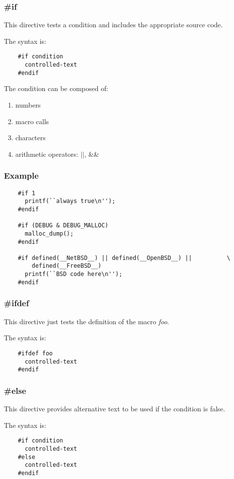 \documentclass[8pt]{beamer}
\newcommand{\nl}[0]{\vspace{0.4cm}}
\begin{document}
\begin{frame}[containsverbatim]
  \frametitle{\textbf{\#if}}

  This directive tests a condition and includes the appropriate source code.

  \nl

  The syntax is:

  \begin{verbatim}
    #if condition
      controlled-text
    #endif
  \end{verbatim}

  The condition can be composed of:

  \begin{enumerate}
    \item
      numbers
    \item
      macro calls
    \item
      characters
    \item
      arithmetic operators: $||$, \&\&
  \end{enumerate}
\end{frame}


\begin{frame}[containsverbatim]
  \frametitle{Example}

  \begin{verbatim}
    #if 1
      printf(``always true\n'');
    #endif

    #if (DEBUG & DEBUG_MALLOC)
      malloc_dump();
    #endif

    #if defined(__NetBSD__) || defined(__OpenBSD__) ||          \
        defined(__FreeBSD__)
      printf(``BSD code here\n'');
    #endif
  \end{verbatim}
\end{frame}


\begin{frame}[containsverbatim]
  \frametitle{\textbf{\#ifdef}}

  This directive just tests the definition of the macro \textit{foo}.

  \nl

  The syntax is:

  \begin{verbatim}
    #ifdef foo
      controlled-text
    #endif
  \end{verbatim}
\end{frame}


\begin{frame}[containsverbatim]
  \frametitle{\textbf{\#else}}

  This directive provides alternative text to be used if the condition
  is false.

  \nl

  The syntax is:

  \begin{verbatim}
    #if condition
      controlled-text
    #else
      controlled-text
    #endif
  \end{verbatim}
\end{frame}
\end{document}
